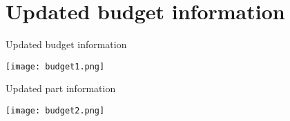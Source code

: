 \documentclass[onecolumn,10pt]{IEEEtran}
\begin{document}
\clearpage
\appendix
\section{Updated budget information}
\begin{table}[h]
\caption{Updated budget information}
\label{tab:1}
\begin{center}
\texttt{[image: budget1.png]}
\end{center}
\end{table}
\begin{table}[h]
\caption{Updated part information}
\label{tab:2}
\begin{center}
\texttt{[image: budget2.png]}
\end{center}
\end{table}
\end{document}
